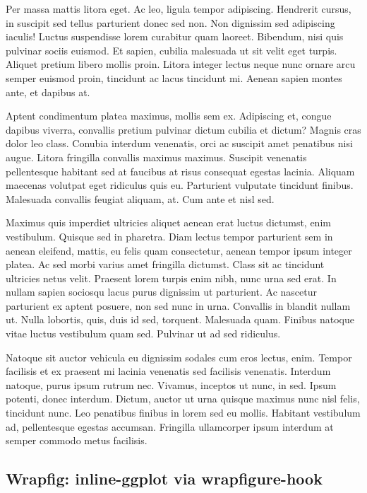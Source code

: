 \documentclass[
  9pt,
  letterpaper,
  DIV=11,
  numbers=noendperiod]{scrartcl}
\begin{document}
Per massa mattis litora eget. Ac leo, ligula tempor adipiscing.
Hendrerit cursus, in suscipit sed tellus parturient donec sed non. Non
dignissim sed adipiscing iaculis! Luctus suspendisse lorem curabitur
quam laoreet. Bibendum, nisi quis pulvinar sociis euismod. Et sapien,
cubilia malesuada ut sit velit eget turpis. Aliquet pretium libero
mollis proin. Litora integer lectus neque nunc ornare arcu semper
euismod proin, tincidunt ac lacus tincidunt mi. Aenean sapien montes
ante, et dapibus at.

Aptent condimentum platea maximus, mollis sem ex. Adipiscing et, congue
dapibus viverra, convallis pretium pulvinar dictum cubilia et dictum?
Magnis cras dolor leo class. Conubia interdum venenatis, orci ac
suscipit amet penatibus nisi augue. Litora fringilla convallis maximus
maximus. Suscipit venenatis pellentesque habitant sed at faucibus at
risus consequat egestas lacinia. Aliquam maecenas volutpat eget
ridiculus quis eu. Parturient vulputate tincidunt finibus. Malesuada
convallis feugiat aliquam, at. Cum ante et nisl sed.

Maximus quis imperdiet ultricies aliquet aenean erat luctus dictumst,
enim vestibulum. Quisque sed in pharetra. Diam lectus tempor parturient
sem in aenean eleifend, mattis, eu felis quam consectetur, aenean tempor
ipsum integer platea. Ac sed morbi varius amet fringilla dictumst. Class
sit ac tincidunt ultricies netus velit. Praesent lorem turpis enim nibh,
nunc urna sed erat. In nullam sapien sociosqu lacus purus dignissim ut
parturient. Ac nascetur parturient ex aptent posuere, non sed nunc in
urna. Convallis in blandit nullam ut. Nulla lobortis, quis, duis id sed,
torquent. Malesuada quam. Finibus natoque vitae luctus vestibulum quam
sed. Pulvinar ut ad sed ridiculus.

Natoque sit auctor vehicula eu dignissim sodales cum eros lectus, enim.
Tempor facilisis et ex praesent mi lacinia venenatis sed facilisis
venenatis. Interdum natoque, purus ipsum rutrum nec. Vivamus, inceptos
ut nunc, in sed. Ipsum potenti, donec interdum. Dictum, auctor ut urna
quisque maximus nunc nisl felis, tincidunt nunc. Leo penatibus finibus
in lorem sed eu mollis. Habitant vestibulum ad, pellentesque egestas
accumsan. Fringilla ullamcorper ipsum interdum at semper commodo metus
facilisis.

\newpage{}

\hypertarget{wrapfig-inline-ggplot-via-wrapfigure-hook}{%
\subsection{Wrapfig: inline-ggplot via
wrapfigure-hook}\label{wrapfig-inline-ggplot-via-wrapfigure-hook}}
\end{document}
